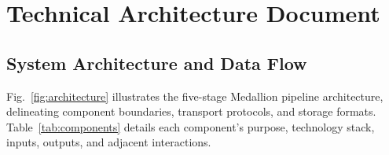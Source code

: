 \section{Technical Architecture Document}

\subsection{System Architecture and Data Flow}
Fig.~\ref{fig:architecture} illustrates the five-stage Medallion pipeline architecture, delineating component boundaries, transport protocols, and storage formats. Table~\ref{tab:components} details each component's purpose, technology stack, inputs, outputs, and adjacent interactions.

